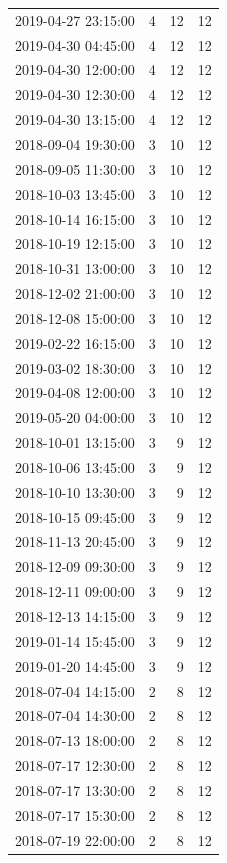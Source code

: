 \begin{tabular}{lrrr}
2019-04-27 23:15:00 & 4 & 12 & 12 \\
2019-04-30 04:45:00 & 4 & 12 & 12 \\
2019-04-30 12:00:00 & 4 & 12 & 12 \\
2019-04-30 12:30:00 & 4 & 12 & 12 \\
2019-04-30 13:15:00 & 4 & 12 & 12 \\
2018-09-04 19:30:00 & 3 & 10 & 12 \\
2018-09-05 11:30:00 & 3 & 10 & 12 \\
2018-10-03 13:45:00 & 3 & 10 & 12 \\
2018-10-14 16:15:00 & 3 & 10 & 12 \\
2018-10-19 12:15:00 & 3 & 10 & 12 \\
2018-10-31 13:00:00 & 3 & 10 & 12 \\
2018-12-02 21:00:00 & 3 & 10 & 12 \\
2018-12-08 15:00:00 & 3 & 10 & 12 \\
2019-02-22 16:15:00 & 3 & 10 & 12 \\
2019-03-02 18:30:00 & 3 & 10 & 12 \\
2019-04-08 12:00:00 & 3 & 10 & 12 \\
2019-05-20 04:00:00 & 3 & 10 & 12 \\
2018-10-01 13:15:00 & 3 & 9 & 12 \\
2018-10-06 13:45:00 & 3 & 9 & 12 \\
2018-10-10 13:30:00 & 3 & 9 & 12 \\
2018-10-15 09:45:00 & 3 & 9 & 12 \\
2018-11-13 20:45:00 & 3 & 9 & 12 \\
2018-12-09 09:30:00 & 3 & 9 & 12 \\
2018-12-11 09:00:00 & 3 & 9 & 12 \\
2018-12-13 14:15:00 & 3 & 9 & 12 \\
2019-01-14 15:45:00 & 3 & 9 & 12 \\
2019-01-20 14:45:00 & 3 & 9 & 12 \\
2018-07-04 14:15:00 & 2 & 8 & 12 \\
2018-07-04 14:30:00 & 2 & 8 & 12 \\
2018-07-13 18:00:00 & 2 & 8 & 12 \\
2018-07-17 12:30:00 & 2 & 8 & 12 \\
2018-07-17 13:30:00 & 2 & 8 & 12 \\
2018-07-17 15:30:00 & 2 & 8 & 12 \\
2018-07-19 22:00:00 & 2 & 8 & 12 \\

\end{tabular}
